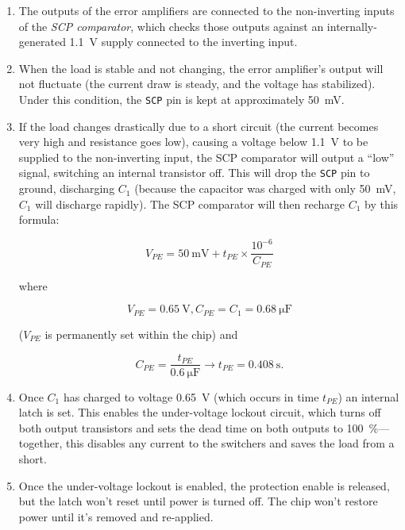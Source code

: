 \documentclass{article}
\newcommand{\chippin}{\texttt}
\begin{document}
\begin{enumerate}
\item The outputs of the error amplifiers are connected to the
  non-inverting inputs of the \textit{SCP comparator}, which checks
  those outputs against an internally-generated \qty{1.1}{\volt}
  supply connected to the inverting input.
\item When the load is stable and not changing, the error amplifier's
  output will not fluctuate (the current draw is steady, and the
  voltage has stabilized). Under this condition, the \chippin{SCP} pin
  is kept at approximately \qty{50}{\milli\volt}.
\item If the load changes drastically due to a short circuit (the
  current becomes very high and resistance goes low), causing a
  voltage below \qty{1.1}{\volt} to be supplied to the non-inverting
  input, the SCP comparator will output a ``low'' signal, switching an
  internal transistor off. This will drop the \chippin{SCP} pin to
  ground, discharging $C_1$ (because the capacitor was charged with
  only \qty{50}{\milli\volt}, $C_1$ will discharge rapidly). The SCP
  comparator will then recharge $C_1$ by this formula:

\begin{displaymath}
  V_{PE} = \qty{50}{\milli\volt} + t_{PE} \times
  \frac{10^{-6}}{C_{PE}}
\end{displaymath}

\noindent
where

\begin{displaymath}
  V_{PE} = \qty{0.65}{\volt}, C_{PE} = C_1 = \qty{0.68}{\micro\farad}
\end{displaymath}

($V_{PE}$ is permanently set within the chip) and

\begin{displaymath}
  C_{PE} = \frac{t_{PE}}{\qty{0.6}{\micro\farad}}
  \rightarrow{} t_{PE} = \qty{0.408}{\second}.
\end{displaymath}

\item Once $C_1$ has charged to voltage \qty{0.65}{\volt} (which
  occurs in time $t_{PE}$) an internal latch is set. This enables the
  under-voltage lockout circuit, which turns off both output
  transistors and sets the dead time on both outputs to
  \qty{100}{\%}---together, this disables any current to the switchers
  and saves the load from a short.
\item Once the under-voltage lockout is enabled, the protection enable
  is released, but the latch won't reset until power is turned
  off. The chip won't restore power until it's removed and re-applied.
\end{enumerate}
\end{document}
